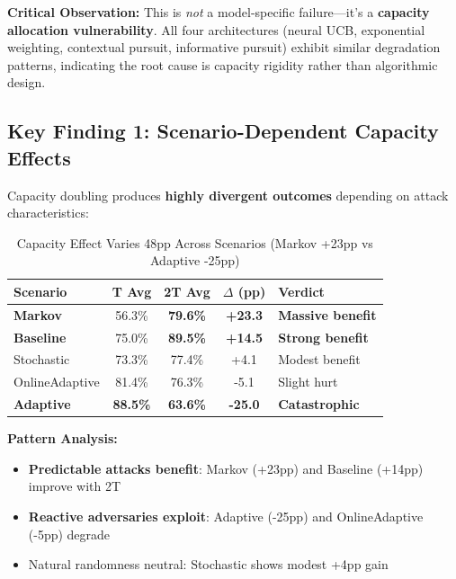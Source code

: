\documentclass[11pt,a4paper]{article}
\newcommand{\critical}[1]{\textcolor{criticalcolor}{\textbf{#1}}}
\newcommand{\success}[1]{\textcolor{successcolor}{\textbf{#1}}}
\begin{document}
\vspace{-0.2cm}
\textbf{Critical Observation:} This is \textit{not} a model-specific failure—it's a \critical{capacity allocation vulnerability}. All four architectures (neural UCB, exponential weighting, contextual pursuit, informative pursuit) exhibit similar degradation patterns, indicating the root cause is capacity rigidity rather than algorithmic design.

\subsection{Key Finding 1: Scenario-Dependent Capacity Effects}

Capacity doubling produces \textbf{highly divergent outcomes} depending on attack characteristics:

\vspace{-0.4cm}
\begin{table}[h]
\scriptsize
\centering
\begin{tabular}{lcccl}
\toprule
\textbf{Scenario} & \textbf{T Avg} & \textbf{2T Avg} & \textbf{$\Delta$ (pp)} & \textbf{Verdict} \\
\midrule
\success{Markov} & 56.3\% & \success{79.6\%} & \success{+23.3} & \success{Massive benefit} \\
\success{Baseline} & 75.0\% & \success{89.5\%} & \success{+14.5} & \success{Strong benefit} \\
Stochastic & 73.3\% & 77.4\% & +4.1 & Modest benefit \\
OnlineAdaptive & 81.4\% & 76.3\% & -5.1 & Slight hurt \\
\critical{Adaptive} & \critical{88.5\%} & \critical{63.6\%} & \critical{-25.0} & \critical{Catastrophic} \\
\bottomrule
\end{tabular}
\vspace{-0.2cm}
\caption{Capacity Effect Varies 48pp Across Scenarios (Markov +23pp vs Adaptive -25pp)}
\end{table}

\vspace{-0.2cm}
\textbf{Pattern Analysis:}
\begin{itemize}
    \vspace{-0.2cm}
    \item \success{Predictable attacks benefit}: Markov (+23pp) and Baseline (+14pp) improve with 2T
    \vspace{-0.2cm}
    \item \critical{Reactive adversaries exploit}: Adaptive (-25pp) and OnlineAdaptive (-5pp) degrade
    \vspace{-0.2cm}
    \item Natural randomness neutral: Stochastic shows modest +4pp gain
\end{itemize}
\end{document}
